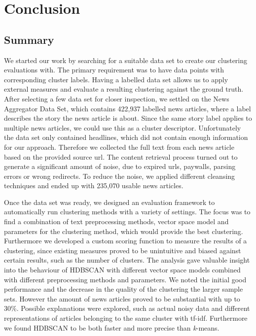 \section{Conclusion}
\label{sec:6_conclusion}

\subsection{Summary}
\label{subsec:6_summary}

We started our work by searching for a suitable data set to create our clustering evaluations with.
The primary requirement was to have data points with corresponding cluster labels.
Having a labelled data set allows us to apply external measures
and evaluate a resulting clustering against the ground truth.
After selecting a few data set for closer inspection, we settled on the News Aggregator Data Set,
which contains 422,937 labelled news articles, where a label describes the story the news article is about.
Since the same story label applies to multiple news articles, we could use this as a cluster descriptor.
Unfortunately the data set only contained headlines, which did not contain enough information for our approach.
Therefore we collected the full text from each news article based on the provided source url.
The content retrieval process turned out to generate a significant amount of noise,
due to expired urls, paywalls, parsing errors or wrong redirects.
To reduce the noise, we applied different cleansing techniques
and ended up with 235,070 usable news articles.

Once the data set was ready, we designed an evaluation framework to automatically run clustering methods
with a variety of settings.
The focus was to find a combination of text preprocessing methods,
vector space model and parameters for the clustering method, which would provide the best clustering.
Furthermore we developed a custom scoring function to measure the results of a clustering,
since existing measures proved to be unintuitive and biased against certain results,
such as the number of clusters.
The analysis gave valuable insight into the behaviour of HDBSCAN with different vector space models
combined with different preprocessing methods and parameters.
We noted the initial good performance and the decrease in the quality of the clustering the larger sample sets.
However the amount of news articles proved to be substantial with up to 30\%.
Possible explanations were explored,
such as actual noisy data and different representations of articles belonging to the same cluster with tf-idf.
Furthermore we found HDBSCAN to be both faster and more precise than \textit{k}-means.

